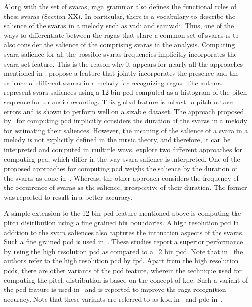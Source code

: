 {Along with the set of \glspl{svara}, \gls{raga} grammar also defines the functional roles of these \glspl{svara} (Section XX). In particular, there is a vocabulary to describe the salience of the \glspl{svara} in a melody such as \gls{vadi} and \gls{samvadi}. Thus, one of the ways to differentiate between the \glspl{raga} that share a common set of \glspl{svara} is to also consider the salience of the comprising \glspl{svara} in the analysis. Computing \gls{svara} salience for all the possible \glspl{svara} frequencies implicitly incorporates the \gls{svara} set feature. This is the reason why it appears for nearly all the approaches mentioned in . \cite{chordia2007raag} propose a feature that jointly incorporates the presence and the salience of different \glspl{svara} in a melody for recognizing \glspl{raga}. The authors represent \gls{svara} saliences using a 12 bin \gls{pcd} computed as a histogram of the pitch sequence for an audio recording. This global feature is robust to pitch octave errors and is shown to perform well on a sizable dataset. The approach proposed by~\cite{chordia2007raag} for computing \gls{pcd} implicitly considers the duration of the \glspl{svara} in a melody for estimating their saliences. However, the meaning of the salience of a \gls{svara} in a melody is not explicitly defined in the music theory, and therefore, it can be interpreted and computed in multiple ways. \cite{koduri2011survey} explore two different approaches for computing \gls{pcd}, which differ in the way \gls{svara} salience is interpreted. One of the proposed approaches for computing \gls{pcd} weighs the salience by the duration of the \glspl{svara} as done in~\cite{chordia2007raag}. Whereas, the other approach considers the frequency of the occurrence of \glspl{svara} as the salience, irrespective of their duration. The former was reported to result in a better accuracy.

A simple extension to the 12 bin \gls{pcd} feature mentioned above is computing the pitch distribution using a fine grained bin boundaries. A high resolution \gls{pcd} in addition to the \gls{svara} saliences also captures the intonation aspects of the \glspl{svara}. Such a fine grained \gls{pcd} is used in~\cite{chordia2013joint,koduri2012raga,belle2009raga,kumar2014identifying}. These studies report a superior performance by using the high resolution \gls{pcd} as compared to a 12 bin \gls{pcd}. Note that in~\cite{chordia2013joint} the authors refer to the high resolution \gls{pcd} by \gls{fpd}. Apart from the high resolution \glspl{pcd}, there are other variants of the \gls{pcd} feature, wherein the technique used for computing the pitch distribution is based on the concept of \gls{kde}. Such a variant of the \gls{pcd} feature is used in~\cite{chordia2013joint,ranjani2011carnatic} and is reported to improve the \gls{raga} recognition accuracy. Note that these variants are referred to as \gls{kpd} in~\cite{chordia2013joint} and \gls{pde} in~\cite{ranjani2011carnatic}. 

}
